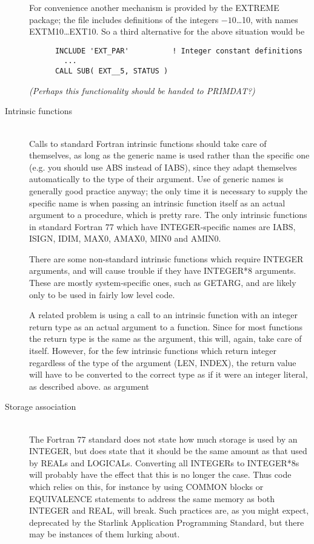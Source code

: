 \documentclass[twoside,11pt]{article}
\newcommand{\xref}[3]{#1}
\renewcommand{\_}{\texttt{\symbol{95}}}
\begin{document}
\begin{description}
For convenience another mechanism is provided by the EXTREME package;
the file \file{EXT\_PAR} includes definitions of the integers
$-10$\ldots 10, with names EXT\_\_M10\ldots EXT\_\_10.
So a third alternative for the above situation would be
\begin{squote}
\begin{verbatim}
      INCLUDE 'EXT_PAR'          ! Integer constant definitions
        ...
      CALL SUB( EXT__5, STATUS )
\end{verbatim}
\end{squote}
{\it (Perhaps this functionality should be handed to PRIMDAT?)}
%
\item[Intrinsic functions]\mbox{}
\\
Calls to standard Fortran intrinsic functions should take care of themselves,
as long as the generic name is used rather than the specific one
(e.g. you should use ABS instead of IABS),
since they adapt themselves automatically to the type of their argument.  
Use of generic names is generally good practice anyway;
the only time it is necessary to supply the specific name is 
when passing an intrinsic function itself as an actual argument
to a procedure, which is pretty rare.
The only intrinsic functions in standard Fortran 77 which have 
INTEGER-specific names are IABS, ISIGN, IDIM, MAX0, AMAX0, MIN0 and AMIN0.

There are some non-standard intrinsic functions which require INTEGER
arguments, and will cause trouble if they have INTEGER*8 arguments.
These are mostly system-specific ones, such as GETARG,
and are likely only to be used in fairly low level code.

A related problem is using a call to an intrinsic function with 
an integer return type as an actual argument to a function.
Since for most functions the return type is the same as the argument,
this will, again, take care of itself.  However, for the few
intrinsic functions which return integer regardless of the type of
the argument (LEN, INDEX), the return value will have to be converted to
the correct type as if it were an integer literal, as described above.
as argument
%
\item[Storage association]\mbox{}
\\
The Fortran 77 standard does not state how much storage is used by
an INTEGER, but does state that it should be the same amount as that
used by REALs and LOGICALs.
Converting all INTEGERs to INTEGER*8s will
probably have the effect that this is no longer the case.
Thus code which relies on this, for instance by using COMMON blocks or
EQUIVALENCE statements to address the same memory as both INTEGER and REAL,
will break.  
Such practices are, as you might expect, deprecated by the 
\xref{Starlink Application Programming Standard}{sgp16}{},
but there may be instances of them lurking about.


\end{description}
\end{document}
